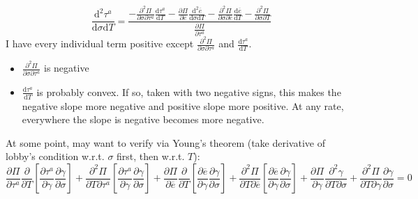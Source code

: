 \documentclass[12pt]{article}
\newcommand{\ov}{\overline}
\newcommand{\ga}{\gamma}
\begin{document}
\[
  \frac{\mathrm{d}^2 \tau^a}{\mathrm{d} \sigma \mathrm{d} T} = \frac{- \frac{\partial^2 \Pi}{\partial \sigma \partial \tau^a}\frac{\mathrm{d} \tau^a}{\mathrm{d} T} - \frac{\partial \Pi}{\partial \ov{e}} \frac{\mathrm{d}^2 \ov{e}}{\mathrm{d} \sigma \mathrm{d} T} - \frac{\partial^2 \Pi}{\partial \sigma \partial \ov{e}} \frac{\mathrm{d} \ov{e}}{\mathrm{d} T} - \frac{\partial^2 \Pi}{\partial \sigma \partial T}}{\frac{\partial \Pi}{\partial \tau^a}}
\]
I have every individual term positive except $\frac{\partial^2 \Pi}{\partial \sigma \partial \tau^a}$ and $\frac{\mathrm{d} \tau^a}{\mathrm{d} T}$.
\begin{itemize}
	\item $\frac{\partial^2 \Pi}{\partial \sigma \partial \tau^a}$ is negative
	\item $\frac{\mathrm{d} \tau^a}{\mathrm{d} T}$ is probably convex. If so, taken with two negative signs, this makes the negative slope more negative and positive slope more positive. At any rate, everywhere the slope is negative becomes more negative.
\end{itemize}


\newpage
At some point, may want to verify via Young's theorem (take derivative of lobby's condition w.r.t. $\sigma$ first, then w.r.t. $T$):
\[
  \frac{\partial \Pi}{\partial \tau^a} \frac{\partial}{\partial T} \left[\frac{\partial \tau^a}{\partial \ga }\frac{\partial \ga}{\partial \sigma }\right] + \frac{\partial^2 \Pi}{\partial T \partial \tau^a} \left[\frac{\partial \tau^a}{\partial \ga }\frac{\partial \ga}{\partial \sigma }\right] + \frac{\partial \Pi}{\partial \ov{e}} \frac{\partial}{\partial T} \left[\frac{\partial \ov{e}}{\partial \ga }\frac{\partial \ga}{\partial \sigma }\right]+ \frac{\partial^2 \Pi}{\partial T \partial \ov{e}} \left[\frac{\partial \ov{e}}{\partial \ga }\frac{\partial \ga}{\partial \sigma}\right] + \frac{\partial \Pi}{\partial \ga}\frac{\partial^2 \ga}{\partial T\partial \sigma} + \frac{\partial^2 \Pi}{\partial T \partial \ga}\frac{\partial \ga}{\partial \sigma} = 0
\]

\newpage
\end{document}
